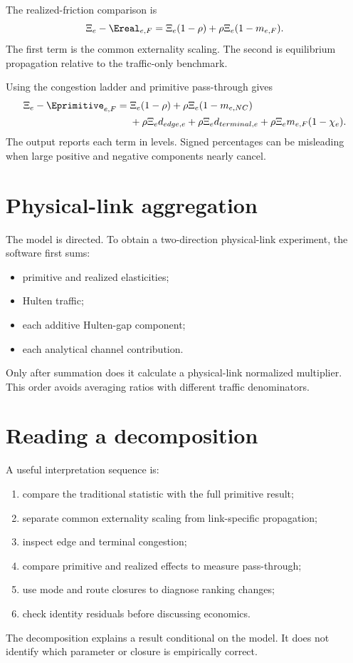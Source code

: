 The realized-friction comparison is
\[
 \Xi_e-\Ereal_{e,F}
 =\Xi_e(1-\rho)+\rho\Xi_e(1-m_{e,F}).
\]
The first term is the common externality scaling. The second is equilibrium
propagation relative to the traffic-only benchmark.

Using the congestion ladder and primitive pass-through gives
\begin{align*}
 \Xi_e-\Eprimitive_{e,F}
 ={}&\Xi_e(1-\rho)
 +\rho\Xi_e(1-m_{e,NC})\\
 &+\rho\Xi_e d_{edge,e}
 +\rho\Xi_e d_{terminal,e}
 +\rho\Xi_e m_{e,F}(1-\chi_e).
\end{align*}
The output reports each term in levels. Signed percentages can be misleading
when large positive and negative components nearly cancel.

\section{Physical-link aggregation}

The model is directed. To obtain a two-direction physical-link experiment, the
software first sums:
\begin{itemize}
  \item primitive and realized elasticities;
  \item Hulten traffic;
  \item each additive Hulten-gap component;
  \item each analytical channel contribution.
\end{itemize}
Only after summation does it calculate a physical-link normalized multiplier.
This order avoids averaging ratios with different traffic denominators.


\section{Reading a decomposition}

A useful interpretation sequence is:
\begin{enumerate}
  \item compare the traditional statistic with the full primitive result;
  \item separate common externality scaling from link-specific propagation;
  \item inspect edge and terminal congestion;
  \item compare primitive and realized effects to measure pass-through;
  \item use mode and route closures to diagnose ranking changes;
  \item check identity residuals before discussing economics.
\end{enumerate}
The decomposition explains a result conditional on the model. It does not
identify which parameter or closure is empirically correct.
